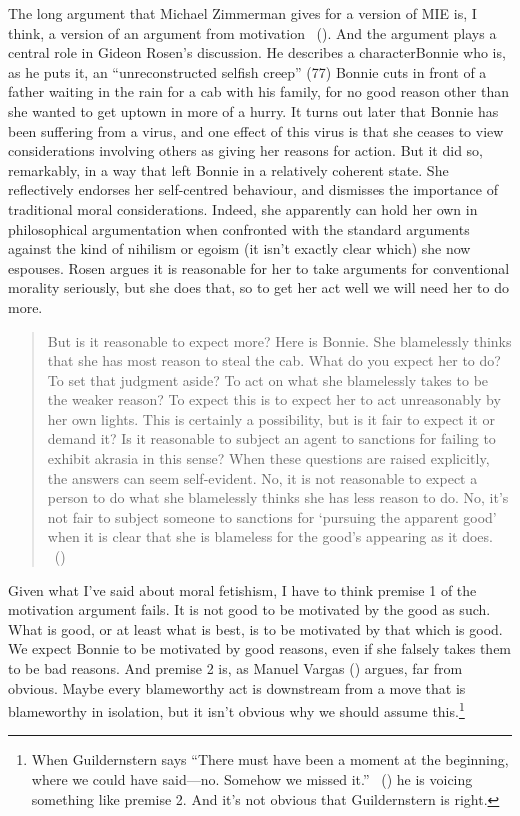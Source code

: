 \documentclass[
  10pt,
  letterpaper,
  twoside]{scrbook}
\begin{document}
The long argument that Michael Zimmerman gives for a version of MIE is,
I think, a version of an argument from motivation
~(). And the argument
plays a central role in Gideon Rosen's discussion. He describes a
character{Bonnie} who is, as he puts it, an ``unreconstructed selfish
creep'' (77) {Bonnie} cuts in front of a father waiting in the rain for
a cab with his family, for no good reason other than she wanted to get
uptown in more of a hurry. It turns out later that {Bonnie} has been
suffering from a virus, and one effect of this virus is that she ceases
to view considerations involving others as giving her reasons for
action. But it did so, remarkably, in a way that left {Bonnie} in a
relatively coherent state. She reflectively endorses her self-centred
behaviour, and dismisses the importance of traditional moral
considerations. Indeed, she apparently can hold her own in philosophical
argumentation when confronted with the standard arguments against the
kind of nihilism or egoism (it isn't exactly clear which) she now
espouses. Rosen argues it is reasonable for her to take arguments for
conventional morality seriously, but she does that, so to get her act
well we will need her to do more.

\begin{quote}
But is it reasonable to expect more? Here is {Bonnie}. She blamelessly
thinks that she has most reason to steal the cab. What do you expect her
to do? To set that judgment aside? To act on what she blamelessly takes
to be the weaker reason? To expect this is to expect her to act
unreasonably by her own lights. This is certainly a possibility, but is
it fair to expect it or demand it? Is it reasonable to subject an agent
to sanctions for failing to exhibit akrasia in this sense? When these
questions are raised explicitly, the answers can seem self-evident. No,
it is not reasonable to expect a person to do what she blamelessly
thinks she has less reason to do. No, it's not fair to subject someone
to sanctions for `pursuing the apparent good' when it is clear that she
is blameless for the good's appearing as it does.
~()
\end{quote}

Given what I've said about moral fetishism, I have to think premise 1 of
the motivation argument fails. It is not good to be motivated by the
good as such. What is good, or at least what is best, is to be motivated
by that which is good. We expect {Bonnie} to be motivated by good
reasons, even if she falsely takes them to be bad reasons. And premise 2
is, as Manuel Vargas () argues, far from
obvious. Maybe every blameworthy act is downstream from a move that is
blameworthy in isolation, but it isn't obvious why we should assume
this.\footnote{When Guildernstern says ``There must have been a moment
  at the beginning, where we could have said---no. Somehow we missed
  it.'' ~() he is
  voicing something like premise 2. And it's not obvious that
  Guildernstern is right.}
\end{document}

